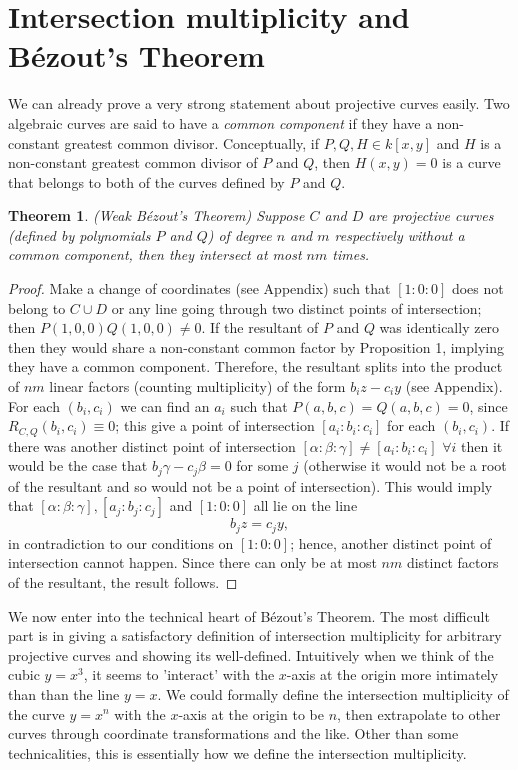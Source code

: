 \documentclass{article}
\newtheorem{theorem}{Theorem}
\theoremstyle{remark}
\begin{document}
\section{Intersection multiplicity and Bézout's Theorem}
We can already prove a very strong statement about projective curves easily. Two algebraic curves are said to have a \textit{common component} if they have a non-constant greatest common divisor. Conceptually, if $P,Q,H\in k[x,y]$ and $H$ is a non-constant greatest common divisor of $P$ and $Q$, then $H(x,y)=0$ is a curve that belongs to both of the curves defined by $P$ and $Q$.
\begin{theorem}
(Weak Bézout's Theorem) Suppose $C$ and $D$ are projective curves (defined by polynomials $P$ and $Q$) of degree $n$ and $m$ respectively without a common component, then they intersect at most $nm$ times.
\end{theorem}
\begin{proof}
Make a change of coordinates (see Appendix) such that $[1:0:0]$ does not belong to $C\cup D$ or any line going through two distinct points of intersection; then $P(1,0,0)Q(1,0,0)\neq 0$. If the resultant of $P$ and $Q$ was identically zero then they would share a non-constant common factor by Proposition 1, implying they have a common component. Therefore, the resultant splits into the product of $nm$ linear factors (counting multiplicity) of the form $b_{i}z- c_{i}y$ (see Appendix). For each $(b_i,c_i)$ we can find an $a_i$ such that $P(a,b,c)=Q(a,b,c)=0$, since $R_{C,Q}(b_i,c_i)\equiv 0$; this give a point of intersection $[a_i:b_i:c_i]$ for each $(b_i,c_i)$. If there was another distinct point of intersection $[\alpha:\beta:\gamma]\neq [a_i:b_i:c_i]$ $\forall i$ then it would be the case that $b_j \gamma-c_j\beta =0$ for some $j$ (otherwise it would not be a root of the resultant and so would not be a point of intersection). This would imply that $[\alpha:\beta:\gamma], [a_j:b_j:c_j]$ and $[1:0:0]$ all lie on the line
\[b_jz=c_jy,\]
in contradiction to our conditions on $[1:0:0]$; hence, another distinct point of intersection cannot happen. Since there can only be at most $nm$ distinct factors of the resultant, the result follows.
\end{proof}
We now enter into the technical heart of Bézout's Theorem. The most difficult part is in giving a satisfactory definition of intersection multiplicity for arbitrary projective curves and showing its well-defined. Intuitively when we think of the cubic $y=x^3$, it seems to 'interact' with the $x$-axis at the origin more intimately than than the line $y=x$. We could formally define the intersection multiplicity of the curve $y=x^n$ with the $x$-axis at the origin to be $n$, then extrapolate to other curves through coordinate transformations and the like. Other than some technicalities, this is essentially how we define the intersection multiplicity.
\end{document}
